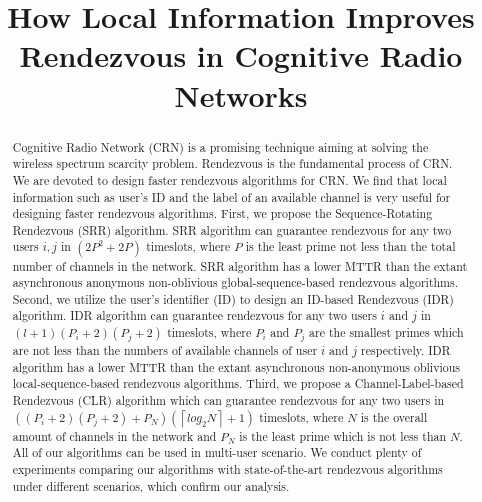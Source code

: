 \documentclass[10pt, conference, letterpaper]{IEEEtran}
\begin{document}
\title{How Local Information Improves Rendezvous in Cognitive Radio Networks}

%

\maketitle


\begin{abstract}
Cognitive Radio Network (CRN) is a promising technique aiming at solving the wireless spectrum scarcity problem. Rendezvous is the fundamental process of CRN.  We are devoted to design faster rendezvous algorithms for CRN. We find that local information such as user's ID and the label of an available channel is very useful for designing faster rendezvous algorithms. First, we propose the Sequence-Rotating Rendezvous (SRR) algorithm. SRR algorithm can guarantee rendezvous for any two users $i,j$ in $(2 P^2+2P)$ timeslots, where $P$ is the least prime not less than the total number of channels in the network. SRR algorithm has a lower MTTR than the extant asynchronous anonymous non-oblivious global-sequence-based rendezvous algorithms. Second, we utilize the user's identifier (ID) to design an ID-based Rendezvous (IDR) algorithm. IDR algorithm can guarantee rendezvous for any two users $i$ and $j$ in $(l+1)(P_i+2)(P_j+2)$ timeslots, where $P_i$ and $P_j$ are the smallest primes which are not less than the numbers of available channels of user $i$ and $j$ respectively. IDR algorithm has a lower MTTR than the extant asynchronous non-anonymous oblivious local-sequence-based rendezvous algorithms. Third, we propose a Channel-Label-based Rendezvous (CLR) algorithm which can guarantee rendezvous for any two users in $((P_i +2)(P_j+2) + P_N)(\left \lceil log_2 N \right \rceil + 1)$ timeslots, where $N$ is the overall amount of channels in the network and $P_N$ is the least prime which is not less than $N$.  All of our algorithms can be used in multi-user scenario. We conduct plenty of experiments comparing our algorithms with state-of-the-art rendezvous algorithms under different scenarios, which confirm our analysis.
\end{abstract}
\end{document}
